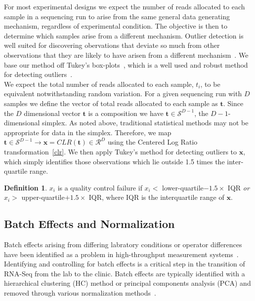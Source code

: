 \documentclass{article}\usepackage[]{graphicx}\usepackage[]{color}
\theoremstyle{definition}
\newtheorem{definition}{Definition}
\begin{document}
For most experimental designs we expect the number of reads allocated to each sample in a sequencing run to arise from the same general data generating mechanism, regardless of experimental condition.  The objective is then to determine which samples arise from a different mechanism.  Outlier detection is well suited for discovering obervations that deviate so much from other observations that they are likely to have arisen from a different mechanism~\cite{Hawkins1980}.  We base our method off Tukey's box-plots~\cite{Tukey1977}, which is a well used and robust method for detecting outliers~\cite{Ben-Gal2009}.\\

We expect the total number of reads allocated to each sample, $t_i$, to be equivalent notwithstanding random variation. For a given sequencing run with $D$ samples we define the vector of total reads allocated to each sample as $\mathbf{t}$.  Since the $D$ dimensional vector $\mathbf{t}$ is a composition we have $\mathbf{t} \in \mathcal{S}^{D-1}$, the $D-1$-dimensional simplex. As noted above, traditional statistical methods may not be appropriate for data in the simplex.  Therefore, we map $\mathbf{t} \in \mathcal{S}^{D-1} \rightarrow \mathbf{x} = CLR(\mathbf{t}) \in \mathcal{R}^D$ using the Centered Log Ratio transformation~\ref{clr}.  We then apply Tukey's method for detecting outliers to $\mathbf{x}$, which simply identifies those observations which lie outside 1.5 times the inter-quartile range.

\theoremstyle{definition}
\begin{definition}
$x_i$ is a quality control failure if $x_i <$ lower-quartile$- 1.5 \times$ IQR \emph{or}  $x_i >$ upper-quartile$+ 1.5 \times$ IQR, where IQR is the interquartile range of $\mathbf{x}$.
\end{definition}









\subsection{Batch Effects and Normalization}
Batch effects arising from differing labratory conditions or operator differences have been identified as a problem in high-throughput measurement systems~\cite{leek2010, chen2011}.  Identifying and controlling for batch effects is a critical step in the transition of RNA-Seq from the lab to the clinic.  Batch effects are typically identified with a hierarchical clustering (HC) method or principal components analysis (PCA) and removed through various normalization methods~\cite{Robinson2007, Anders2010, Robinson2010, Law2014, leek2014}.  \\ %
\end{document}
